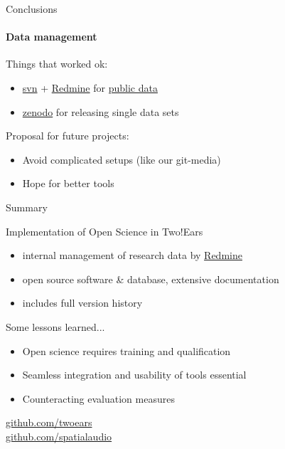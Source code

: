 \documentclass{beamer}
\begin{document}
\begin{frame}{Conclusions}
\framesubtitle{Data management}

    Things that worked ok:
    \begin{itemize}
        \item \href{https://subversion.apache.org}{svn} +
            \href{http://www.redmine.org}{Redmine} for
            \href{https://dev.qu.tu-berlin.de/projects/twoears-getdata/repository}{public
            data}
        \item \href{https://zenodo.org}{zenodo} for releasing single data sets
    \end{itemize}

    \vspace{0.6cm}

    Proposal for future projects:
    \begin{itemize}
        \item Avoid complicated setups (like our git-media)
        \item Hope for better tools
    \end{itemize}

\end{frame}


\begin{frame}{Summary}

Implementation of Open Science in Two!Ears
\begin{itemize}
\item internal management of research data by \href{http://www.redmine.org}{Redmine}
\item open source software \& database, extensive documentation
\item includes full version history
\end{itemize}

\vfill

Some lessons learned...
\begin{itemize}
\item Open science requires training and qualification
\item Seamless integration and usability of tools essential
\item Counteracting evaluation measures
\end{itemize}

\vfill

\url{github.com/twoears}\\[1ex]
\url{github.com/spatialaudio}

\end{frame}
\end{document}
